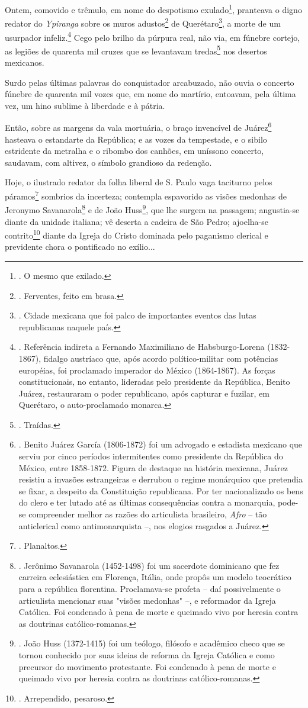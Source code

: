 Ontem, comovido e trêmulo, em nome do despotismo exulado\footnote{. O
  mesmo que exilado.}, pranteava o digno redator do \emph{Ypiranga}
sobre os muros adustos\footnote{. Ferventes, feito em brasa.} de
Querétaro\footnote{. Cidade mexicana que foi palco de importantes
  eventos das lutas republicanas naquele país.}, a morte de um usurpador
infeliz.\footnote{. Referência indireta a Fernando Maximiliano de
  Habsburgo-Lorena (1832-1867), fidalgo austríaco que, após acordo
  político-militar com potências européias, foi proclamado imperador do
  México (1864-1867). As forças constitucionais, no entanto, lideradas
  pelo presidente da República, Benito Juárez, restauraram o poder
  republicano, após capturar e fuzilar, em Querétaro, o auto-proclamado
  monarca.} Cego pelo brilho da púrpura real, não via, em fúnebre
cortejo, as legiões de quarenta mil cruzes que se levantavam
tredas\footnote{. Traídas.} nos desertos mexicanos.

Surdo pelas últimas palavras do conquistador arcabuzado, não ouvia o
concerto fúnebre de quarenta mil vozes que, em nome do martírio,
entoavam, pela última vez, um hino sublime à liberdade e à pátria.

Então, sobre as margens da vala mortuária, o braço invencível de
Juárez\footnote{. Benito Juárez García (1806-1872) foi um advogado e
  estadista mexicano que serviu por cinco períodos intermitentes como
  presidente da República do México, entre 1858-1872. Figura de destaque
  na história mexicana, Juárez resistiu a invasões estrangeiras e
  derrubou o regime monárquico que pretendia se fixar, a despeito da
  Constituição republicana. Por ter nacionalizado os bens do clero e ter
  lutado até as últimas consequências contra a monarquia, pode-se
  compreender melhor as razões do articulista brasileiro, \emph{Afro} --
  tão anticlerical como antimonarquista --, nos elogios rasgados a
  Juárez.} hasteava o estandarte da República; e as vozes da tempestade,
e o sibilo estridente da metralha e o ribombo dos canhões, em uníssono
concerto, saudavam, com altivez, o símbolo grandioso da redenção.

Hoje, o ilustrado redator da folha liberal de S. Paulo vaga taciturno
pelos páramos\footnote{. Planaltos.} sombrios da incerteza; contempla
espavorido as visões medonhas de Jeronymo Savanarola\footnote{. Jerônimo
  Savanarola (1452-1498) foi um sacerdote dominicano que fez carreira
  eclesiástica em Florença, Itália, onde propôs um modelo teocrático
  para a república florentina. Proclamava-se profeta -- daí
  possivelmente o articulista mencionar suas "visões medonhas" --, e
  reformador da Igreja Católica. Foi condenado à pena de morte e
  queimado vivo por heresia contra as doutrinas católico-romanas.} e de
João Huss\footnote{. João Huss (1372-1415) foi um teólogo, filósofo e
  acadêmico checo que se tornou conhecido por suas ideias de reforma da
  Igreja Católica e como precursor do movimento protestante. Foi
  condenado à pena de morte e queimado vivo por heresia contra as
  doutrinas católico-romanas.}, que lhe surgem na passagem; angustia-se
diante da unidade italiana; vê deserta a cadeira de São Pedro;
ajoelha-se contrito\footnote{. Arrependido, pesaroso.} diante da Igreja
do Cristo dominada pelo paganismo clerical e previdente chora o
pontificado no exílio...

